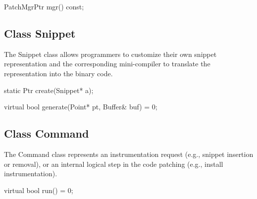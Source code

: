 \begin{apient}
PatchMgrPtr mgr() const;
\end{apient}



\subsection{Class Snippet}
\label{sec:snippet}


The Snippet class allows programmers to customize their own snippet
representation and the corresponding mini-compiler to translate the
representation into the binary code.


\begin{apient}
static Ptr create(Snippet* a);
\end{apient}



\begin{apient}
virtual bool generate(Point* pt, Buffer& buf) = 0;
\end{apient}



\subsection{Class Command}
\label{sec:command}


The Command class represents an instrumentation request (e.g., snippet insertion
or removal), or an internal logical step in the code patching (e.g., install
instrumentation).


\begin{apient}
virtual bool run() = 0;
\end{apient}



